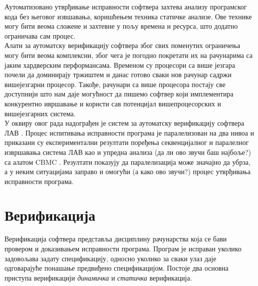 \documentclass[12pt,oneside]{memoir}
\begin{document}
\indent Аутоматизовано утврђивање исправности софтвера захтева анализу програмског кода без његовог извшавања, коришћењем техника статичке анализе. Ове технике могу бити веома сложене и захтевне у пољу времена и ресурса, што додатно ограничава сам процес. \\
\indent Алати за аутоматску верификацију софтвера због свих поменутих ограничења могу бити веома комплексни, због чега је погодно покретати их на рачунарима са јаким хардверским перформансама. Временом су процесори са више језгара почели да доминирају тржиштем и данас готово сваки нов рачунар садржи вишејезгарни процесор. Такође, рачунари са више процесора постају све доступнији што нам даје могућност да пишемо софтвер који имплементира конкурентно ивршавање и користи сав потенцијал вишепроцесорских и вишејезгарних система.\\
\indent У оквиру овог рада надограђен је систем за аутоматску верификацију софтвера ЛАВ \cite{mvjphd}. Процес испитивања исправности програма је паралелизован на два нивоа и приказани су експериментални резултати поређења секвенцијалног и паралелног извршавања система ЛАВ као и упредна анализа (да ли ово звучи баш најбоље?) са алатом CBMC \cite{cbmc}. Резултати показују да паралелизација може значајно да убрза, а у неким ситуацијама заправо и омогући (а како ово звучи?) процес утврђивања исправности програма.



\chapter{Верификација}
	Верификација софтвера представља дисциплину рачунарства која се бави провером и доказивањем исправности програма. Програм је исправан уколико задовољава задату спецификацију, односно уколико за сваки улаз даје одговарајуће понашање предвиђено спецификацијом. Постоје два основна приступа верификацији \emph{динамичка} и \emph{статичка} верификација.
\end{document}

